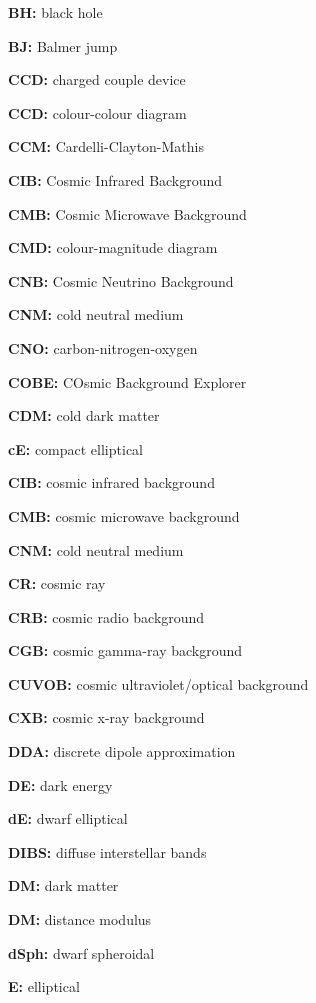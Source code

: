\documentclass[a4paper,10pt]{article}
\begin{document}
{\noindent}\textbf{BH:} black hole

{\noindent}\textbf{BJ:} Balmer jump

{\noindent}\textbf{CCD:} charged couple device

{\noindent}\textbf{CCD:} colour-colour diagram

{\noindent}\textbf{CCM:} Cardelli-Clayton-Mathis

{\noindent}\textbf{CIB:} Cosmic Infrared Background

{\noindent}\textbf{CMB:} Cosmic Microwave Background

{\noindent}\textbf{CMD:} colour-magnitude diagram

{\noindent}\textbf{CNB:} Cosmic Neutrino Background

{\noindent}\textbf{CNM:} cold neutral medium

{\noindent}\textbf{CNO:} carbon-nitrogen-oxygen

{\noindent}\textbf{COBE:} COsmic Background Explorer

{\noindent}\textbf{CDM:} cold dark matter

{\noindent}\textbf{cE:} compact elliptical

{\noindent}\textbf{CIB:} cosmic infrared background

{\noindent}\textbf{CMB:} cosmic microwave background

{\noindent}\textbf{CNM:} cold neutral medium

{\noindent}\textbf{CR:} cosmic ray

{\noindent}\textbf{CRB:} cosmic radio background

{\noindent}\textbf{CGB:} cosmic gamma-ray background

{\noindent}\textbf{CUVOB:} cosmic ultraviolet/optical background

{\noindent}\textbf{CXB:} cosmic x-ray background

{\noindent}\textbf{DDA:} discrete dipole approximation

{\noindent}\textbf{DE:} dark energy

{\noindent}\textbf{dE:} dwarf elliptical

{\noindent}\textbf{DIBS:} diffuse interstellar bands

{\noindent}\textbf{DM:} dark matter

{\noindent}\textbf{DM:} distance modulus

{\noindent}\textbf{dSph:} dwarf spheroidal

{\noindent}\textbf{E:} elliptical
\end{document}
